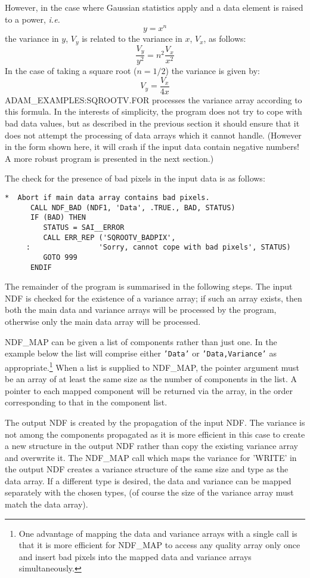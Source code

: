 However,  in the case where Gaussian statistics apply and
a data element is raised to a power, {\it i.e.}
$$ y=x^n$$
the variance in $y$, $V_y$ is related to the variance in $x$, $V_x$, as 
follows:
$$\frac{V_y}{y^2}=n^2\frac{V_x}{x^2}$$
In the case of taking a square root ($n=1/2$) the variance 
is given by:
$$V_y=\frac{V_x}{4x}$$
ADAM\_EXAMPLES:SQROOTV.FOR processes the variance array
according to this formula.
In the interests of simplicity, the program does not try to cope
with bad data values, but as described in 
the previous section it should ensure that it does not attempt the
processing of data arrays which it cannot handle.
(However in the form shown here, it will crash if the input data contain
negative numbers! A more robust program is presented in the next section.)

The check for the presence of bad pixels in the input data is as follows:
\begin{verbatim}
*  Abort if main data array contains bad pixels.
      CALL NDF_BAD (NDF1, 'Data', .TRUE., BAD, STATUS)
      IF (BAD) THEN
         STATUS = SAI__ERROR
         CALL ERR_REP ('SQROOTV_BADPIX',
     :                'Sorry, cannot cope with bad pixels', STATUS)
         GOTO 999
      ENDIF      
\end{verbatim}
The remainder of the program is summarised in the following steps.
The input NDF is checked for the existence of a variance array;
if such an array exists, then both the main data and variance
arrays will be processed by the program, otherwise only the 
main data array  will be processed.

NDF\_MAP can be given a list of components rather than just one. 
In the example below the list will comprise either {\tt 'Data'} or 
{\tt 'Data,Variance'} as 
appropriate.\footnote{One advantage of mapping the data and variance arrays with 
a single call is that it is more efficient for NDF\_MAP to access any quality
array only once and insert bad pixels into the mapped data and variance arrays
simultaneously.}
When a list is supplied to NDF\_MAP, the pointer argument must be an array
of at least the same size as the number of components in the list.
A pointer to each mapped component will be returned via the array, in the
order corresponding to that in the component list.

The output NDF is created by the propagation of the input NDF.
The variance is not among the components propagated as it is more efficient
in this case to create a new structure in the output NDF rather 
than copy the existing variance array and overwrite it.
The NDF\_MAP call which maps the 
variance for 'WRITE' in the output NDF creates a variance structure 
of the same size and type as the data array.
If a different type is desired, the data and variance can be mapped
separately with the chosen types, (of course the size of the variance array 
must  match the data array).

